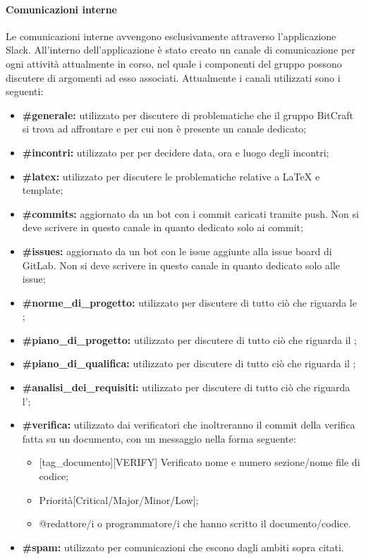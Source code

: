 \paragraph{Comunicazioni interne}
Le comunicazioni interne avvengono esclusivamente attraverso l'applicazione Slack. All'interno dell'applicazione è stato creato un canale di comunicazione per ogni attività attualmente in corso, nel quale i componenti del gruppo possono discutere di argomenti ad esso associati. Attualmente i canali utilizzati sono i seguenti:
\begin{itemize}
	\item \textbf{\#generale:} utilizzato per discutere di problematiche che il gruppo BitCraft si trova ad affrontare e per cui non è presente un canale dedicato;
	\item \textbf{\#incontri:} utilizzato per per decidere data, ora e luogo degli incontri;
	\item \textbf{\#latex:} utilizzato per discutere le problematiche relative a \LaTeX{} e template;
	\item \textbf{\#commits:} aggiornato da un bot con i commit caricati tramite push. Non si deve scrivere in questo canale in quanto dedicato solo ai commit;
	\item \textbf{\#issues:} aggiornato da un bot con le issue aggiunte alla issue board di GitLab. Non si deve scrivere in questo canale in quanto dedicato solo alle issue;
	\item \textbf{\#norme\_di\_progetto:} utilizzato per discutere di tutto ciò che riguarda le \docNameNdP;
	\item \textbf{\#piano\_di\_progetto:} utilizzato per discutere di tutto ciò che riguarda il \docNamePdP;
	\item \textbf{\#piano\_di\_qualifica:} utilizzato per discutere di tutto ciò che riguarda il \docNamePdQ;
	\item \textbf{\#analisi\_dei\_requisiti:} utilizzato per discutere di tutto ciò che riguarda l'\docNameAdR;
	\item \textbf{\#verifica:} utilizzato dai verificatori che inoltreranno il commit della verifica fatta su un documento, con un messaggio nella forma seguente:
	\begin{itemize}
		\item{} [tag\_documento][VERIFY] Verificato nome e numero sezione/nome file di codice;
		\item Priorità[Critical/Major/Minor/Low];
		\item @redattore/i o programmatore/i che hanno scritto il documento/codice.
	\end{itemize}
	\item \textbf{\#spam:} utilizzato per comunicazioni che escono dagli ambiti sopra citati.
\end{itemize}
